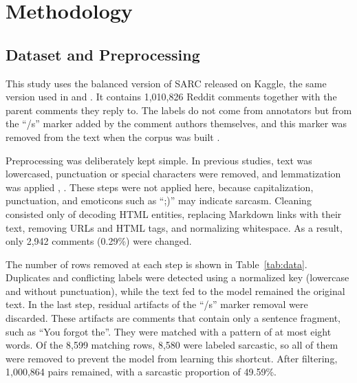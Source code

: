 \documentclass[conference]{IEEEtran}
\begin{document}
\section{Methodology}

\subsection{Dataset and Preprocessing}
\label{sec:data}
This study uses the balanced version of SARC \cite{khodak2018sarc} released on Kaggle, the same version used in \cite{dubey2026efficient} and \cite{zhang2025enhancing}. It contains 1,010,826 Reddit comments together with the parent comments they reply to. The labels do not come from annotators but from the ``/s'' marker added by the comment authors themselves, and this marker was removed from the text when the corpus was built \cite{khodak2018sarc}.

Preprocessing was deliberately kept simple. In previous studies, text was lowercased, punctuation or special characters were removed, and lemmatization was applied \cite{dubey2026efficient}, \cite{zhang2025enhancing}. These steps were not applied here, because capitalization, punctuation, and emoticons such as ``;)'' may indicate sarcasm. Cleaning consisted only of decoding HTML entities, replacing Markdown links with their text, removing URLs and HTML tags, and normalizing whitespace. As a result, only 2,942 comments (0.29\%) were changed.

The number of rows removed at each step is shown in Table~\ref{tab:data}. Duplicates and conflicting labels were detected using a normalized key (lowercase and without punctuation), while the text fed to the model remained the original text. In the last step, residual artifacts of the ``/s'' marker removal were discarded. These artifacts are comments that contain only a sentence fragment, such as ``You forgot the''. They were matched with a pattern of at most eight words. Of the 8,599 matching rows, 8,580 were labeled sarcastic, so all of them were removed to prevent the model from learning this shortcut. After filtering, 1,000,864 pairs remained, with a sarcastic proportion of 49.59\%.
\end{document}
